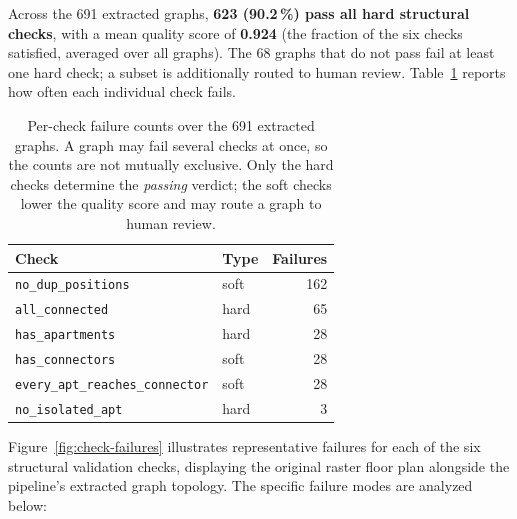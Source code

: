 \documentclass[12pt,a4paper,openright]{report}
\newcommand{\code}[1]{\texttt{#1}}
\begin{document}
Across the 691 extracted graphs, \textbf{623 (90.2\,\%) pass all hard structural checks}, with a mean quality score of \textbf{0.924} (the fraction of the six checks satisfied, averaged over all graphs). The 68 graphs that do not pass fail at least one hard check; a subset is additionally routed to human review. Table~\ref{tab:val-rules} reports how often each individual check fails.

\begin{table}[ht]
\centering
\begin{tabular}{@{}llr@{}}
\toprule
\textbf{Check} & \textbf{Type} & \textbf{Failures} \\
\midrule
\code{no\_dup\_positions}            & soft & 162 \\
\code{all\_connected}                & hard & 65 \\
\code{has\_apartments}               & hard & 28 \\
\code{has\_connectors}               & soft & 28 \\
\code{every\_apt\_reaches\_connector} & soft & 28 \\
\code{no\_isolated\_apt}             & hard & 3 \\
\bottomrule
\end{tabular}
\caption{Per-check failure counts over the 691 extracted graphs. A graph may fail several checks at once, so the counts are not mutually exclusive. Only the hard checks determine the \emph{passing} verdict; the soft checks lower the quality score and may route a graph to human review.}
\label{tab:val-rules}
\end{table}

\noindent Figure~\ref{fig:check-failures} illustrates representative failures for each of the six structural validation checks, displaying the original raster floor plan alongside the pipeline's extracted graph topology. The specific failure modes are analyzed below:
\end{document}

